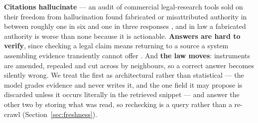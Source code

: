 \documentclass{article}
\begin{document}
\textbf{Citations hallucinate} --- an audit of commercial legal-research tools
sold on their freedom from hallucination found fabricated or misattributed
authority in between roughly one in six and one in three responses
\citep{magesh2024hallucination,dahl2024fictions}, and in law a fabricated
authority is worse than none because it is actionable. \textbf{Answers are hard
to verify}, since checking a legal claim means returning to a source a system
assembling evidence transiently cannot offer \citep{liu2023verifiability}. And
\textbf{the law moves}: instruments are amended, repealed and cut across by
neighbours, so a correct answer becomes silently wrong. We treat the first as
architectural rather than statistical --- the model grades evidence and never
writes it, and the one field it may propose is discarded unless it occurs
literally in the retrieved snippet --- and answer the other two by storing what
was read, so rechecking is a query rather than a re-crawl
(Section~\ref{sec:freshness}).
\end{document}

